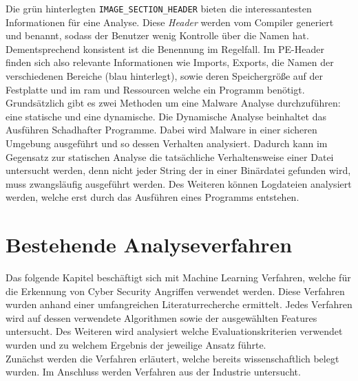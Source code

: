 \documentclass[
    12pt, %
    DIV10,
    ngerman, %
    a4paper, %
    oneside, %
    titlepage, %
    parskip=half, %
    headings=normal, %
    listof=totoc, %
    bibliography=totoc, %
    index=totoc, %
    captions=tableheading, %
    final %
]{scrreprt}
\begin{document}
Die grün hinterlegten \texttt{IMAGE\_SECTION\_HEADER} bieten die interessantesten Informationen für eine Analyse. Diese \emph{Header} werden vom Compiler generiert und benannt, sodass der Benutzer wenig Kontrolle über die Namen hat. Dementsprechend konsistent ist die Benennung im Regelfall. Im PE-Header finden sich also relevante Informationen wie Imports, Exports, die Namen der verschiedenen Bereiche (blau hinterlegt), sowie deren Speichergröße auf der Festplatte und im \ac{ram} und Ressourcen welche ein Programm benötigt.\\
Grundsätzlich gibt es zwei Methoden um eine Malware Analyse durchzuführen: eine statische und eine dynamische.
Die Dynamische Analyse beinhaltet das Ausführen Schadhafter Programme. Dabei wird Malware in einer sicheren Umgebung ausgeführt und so dessen Verhalten analysiert. Dadurch kann im Gegensatz zur statischen Analyse die tatsächliche Verhaltensweise einer Datei untersucht werden, denn nicht jeder String der in einer Binärdatei gefunden wird, muss zwangsläufig ausgeführt werden. Des Weiteren können Logdateien analysiert werden, welche erst durch das Ausführen eines Programms entstehen.
\chapter{Bestehende Analyseverfahren}
\label{sec:ba}
Das folgende Kapitel beschäftigt sich mit Machine Learning Verfahren, welche für die Erkennung von Cyber Security Angriffen verwendet werden. Diese Verfahren wurden anhand einer umfangreichen Literaturrecherche ermittelt. Jedes Verfahren wird auf dessen verwendete Algorithmen sowie der ausgewählten Features untersucht. Des Weiteren wird analysiert welche Evaluationskriterien verwendet wurden und zu welchem Ergebnis der jeweilige Ansatz führte.\\
Zunächst werden die Verfahren erläutert, welche bereits wissenschaftlich belegt wurden. Im Anschluss werden Verfahren aus der Industrie untersucht.
\end{document}
